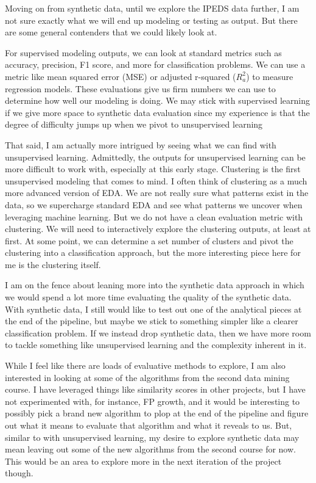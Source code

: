 \documentclass[sigconf, authorversion, nonacm]{acmart}
\begin{document}
    Moving on from synthetic data, until we explore the IPEDS data further, I am not sure exactly what we will end up modeling or testing as output. But there are some general contenders that we could likely look at.

    For supervised modeling outputs, we can look at standard metrics such as accuracy, precision, F1 score, and more for classification problems. We can use a metric like mean squared error (MSE) or adjusted r-squared ($R^2_a$) to measure regression models. These evaluations give us firm numbers we can use to determine how well our modeling is doing. We may stick with supervised learning if we give more space to synthetic data evaluation since my experience is that the degree of difficulty jumps up when we pivot to unsupervised learning

    That said, I am actually more intrigued by seeing what we can find with unsupervised learning. Admittedly, the outputs for unsupervised learning can be more difficult to work with, especially at this early stage. Clustering is the first unsupervised modeling that comes to mind. I often think of clustering as a much more advanced version of EDA. We are not really sure what patterns exist in the data, so we supercharge standard EDA and see what patterns we uncover when leveraging machine learning. But we do not have a clean evaluation metric with clustering. We will need to interactively explore the clustering outputs, at least at first. At some point, we can determine a set number of clusters and pivot the clustering into a classification approach, but the more interesting piece here for me is the clustering itself.

    I am on the fence about leaning more into the synthetic data approach in which we would spend a lot more time evaluating the quality of the synthetic data. With synthetic data, I still would like to test out one of the analytical pieces at the end of the pipeline, but maybe we stick to something simpler like a clearer classification problem. If we instead drop synthetic data, then we have more room to tackle something like unsupervised learning and the complexity inherent in it.

    While I feel like there are loads of evaluative methods to explore, I am also interested in looking at some of the algorithms from the second data mining course. I have leveraged things like similarity scores in other projects, but I have not experimented with, for instance, FP growth, and it would be interesting to possibly pick a brand new algorithm to plop at the end of the pipeline and figure out what it means to evaluate that algorithm and what it reveals to us. But, similar to with unsupervised learning, my desire to explore synthetic data may mean leaving out some of the new algorithms from the second course for now. This would be an area to explore more in the next iteration of the project though.
\end{document}
